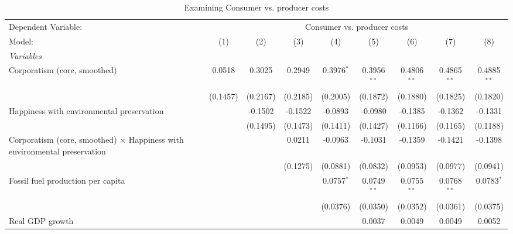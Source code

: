 
\begin{table}[htbp]
   \caption{Examining Consumer vs. producer costs}
   \centering
   \begin{tabular}{lcccccccc}
      \tabularnewline \midrule \midrule
      Dependent Variable: & \multicolumn{8}{c}{Consumer vs. producer costs}\\
      Model:                                                                           & (1)      & (2)      & (3)      & (4)          & (5)           & (6)           & (7)           & (8)\\  
      \midrule
      \emph{Variables}\\
      Corporatism (core, smoothed)                                                     & 0.0518   & 0.3025   & 0.2949   & 0.3976$^{*}$ & 0.3956$^{**}$ & 0.4806$^{**}$ & 0.4865$^{**}$ & 0.4885$^{**}$\\   
                                                                                       & (0.1457) & (0.2167) & (0.2185) & (0.2005)     & (0.1872)      & (0.1880)      & (0.1825)      & (0.1820)\\   
      Happiness with environmental preservation                                        &          & -0.1502  & -0.1522  & -0.0893      & -0.0980       & -0.1385       & -0.1362       & -0.1331\\   
                                                                                       &          & (0.1495) & (0.1473) & (0.1411)     & (0.1427)      & (0.1166)      & (0.1165)      & (0.1188)\\   
      Corporatism (core, smoothed) $\times$ Happiness with environmental preservation  &          &          & 0.0211   & -0.0963      & -0.1031       & -0.1359       & -0.1421       & -0.1398\\   
                                                                                       &          &          & (0.1275) & (0.0881)     & (0.0832)      & (0.0953)      & (0.0977)      & (0.0941)\\   
      Fossil fuel production per capita                                                &          &          &          & 0.0757$^{*}$ & 0.0749$^{**}$ & 0.0755$^{**}$ & 0.0768$^{**}$ & 0.0783$^{*}$\\   
                                                                                       &          &          &          & (0.0376)     & (0.0350)      & (0.0352)      & (0.0361)      & (0.0375)\\   
      Real GDP growth                                                                  &          &          &          &              & 0.0037        & 0.0049        & 0.0049        & 0.0052\\   

\end{tabular}
\end{table}
